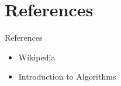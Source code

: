 \section{References}

\begin{frame}{References}

    \begin{itemize}
        \item Wikipedia
        \item Introduction to Algorithms
    \end{itemize}

\end{frame}
